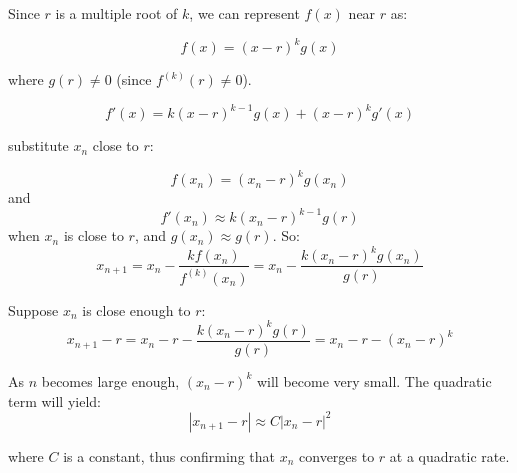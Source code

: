 \documentclass[a4paper]{article}
\begin{document}
Since \( r \) is a multiple root of \( k \), we can represent \( f(x) \) near \( r \) as:

\[f(x) = (x - r)^k g(x)\]

where \( g(r) \neq 0 \) (since \( f^{(k)}(r) \neq 0 \)).

\[f'(x) = k(x - r)^{k-1} g(x) + (x - r)^k g'(x)\]

substitute \( x_n \) close to \( r \):

\[f(x_n) = (x_n - r)^k g(x_n)\]
and
\[f'(x_n) \approx k(x_n - r)^{k - 1} g(r)\]
when \( x_n \) is close to \( r \), and \( g(x_n) \approx g(r) \).
So:
\[x_{n+1} = x_n - \frac{k f(x_n)}{f^{(k)}(x_n)} = x_n - \frac{k (x_n - r)^k g(x_n)}{g(r)}\]

Suppose \( x_n \) is close enough to \( r \):
\[x_{n+1} - r = x_n - r - \frac{k (x_n - r)^k g(r)}{g(r)} 
= x_n - r - (x_n - r)^k\]

As \( n \) becomes large enough, \( (x_n - r)^k \) will become very small. The quadratic term will yield:
\[|x_{n+1} - r| \approx C |x_n - r|^2\]

where \( C \) is a constant, thus confirming that \( x_n \) converges to \( r \) at a quadratic rate.

\end{document}
